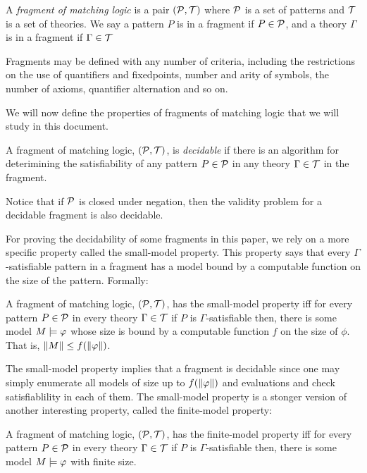 \begin{definition}A \emph{fragment of matching logic} is a pair \((\mathcal{P}, \mathcal{T})\)
where \(\mathcal{P}\) is a set of patterns and \(\mathcal{T}\) is a set of theories.
We say a pattern \(P\) is in a fragment if \(P \in \mathcal{P}\),
and a theory \(\Gamma\) is in a fragment if \(\Gamma \in \mathcal{T}\)\end{definition}

Fragments may be defined with any number of criteria,
including the restrictions on
the use of quantifiers and fixedpoints,
number and arity of symbols,
the number of axioms,
quantifier alternation and so on.

We will now define the properties of fragments of matching logic that we will study in this document.

\begin{definition}A fragment of matching logic, \((\mathcal{P}, \mathcal{T})\), is \emph{decidable}
if there is an algorithm for deterimining the satisfiability of any pattern \(P \in \mathcal{P}\) in any theory \(\Gamma \in \mathcal{T}\) in the fragment.\end{definition}

Notice that if \(\mathcal{P}\) is closed under negation, then the validity problem for a decidable fragment is also decidable.

For proving the decidability of some fragments in this paper, we rely on a more specific property called the small-model property.
This property says that every \(\Gamma\)-satisfiable pattern in a fragment has a model bound by a computable function on the size of the pattern.
Formally:

\begin{definition}A fragment of matching logic, \((\mathcal{P}, \mathcal{T})\), has the small-model property iff for every pattern \(P \in \mathcal{P}\) in every theory \(\Gamma \in \mathcal{T}\)
if \(P\) is \(\Gamma\)-satisfiable then, there is some model \(M \models \varphi\) whose size is bound by a computable function \(f\) on the size of \(\phi\).
That is, \(\left\lVert M\right\rVert \le f(\left\lVert \varphi\right\rVert)\).\end{definition}

The small-model property implies that a fragment is decidable since one may simply
enumerate all models of size up to \(f(\left\lVert \varphi\right\rVert)\) and evaluations
and check satisfiablility in each of them.
The small-model property is a stonger version of another interesting property, called the finite-model property:

\begin{definition}A fragment of matching logic, \((\mathcal{P}, \mathcal{T})\), has the finite-model property iff for every pattern \(P \in \mathcal{P}\) in every theory \(\Gamma \in \mathcal{T}\)
if \(P\) is \(\Gamma\)-satisfiable then, there is some model \(M \models \varphi\) with finite size.\end{definition}

